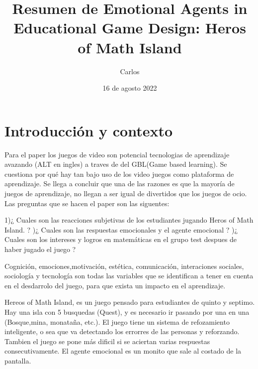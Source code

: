 \documentclass{book}
\begin{document}
\author{Carlos}
\title{Resumen de Emotional Agents in Educational Game Design: Heros of Math Island} 
\date{16 de agosto 2022}
\maketitle

\section{Introducción y contexto}
    Para el paper los juegos de video son potencial tecnologias de aprendizaje avazando (ALT en ingles) a traves de del GBL(Game based learning). Se cuestiona por qué hay tan bajo uso de los video juegos como plataforma de aprendizaje. Se llega a concluir que una de las razones es que la mayoría de juegos de aprendizaje, no llegan a ser igual de divertidos que los juegos de ocio. Las preguntas que se hacen el paper son las siguentes:
\newline
\newline


1)¿ Cuales son las reacciones subjetivas de los estudiantes jugando Heros of Math Island. ?
\newline
{})¿ Cuales son las respuestas emocionales y el agente emocional ?
\newline
{})¿ Cuales son los intereses y logros en matemáticas en el grupo test despues de haber jugado el juego ?
\newline
\newline


    Cognición, emociones,motivación, estética, comunicación, interaciones sociales, sociología y tecnología son todas las variables que se identifican  a tener en cuenta en el desdarrolo del juego, para que exista un impacto en el aprendizaje.
\newline
\newline


    Hereos of Math Island, es un juego pensado para estudiantes de quinto y septimo. Hay una isla con 5 busquedas (Quest), y es necesario ir pasando por una en una (Bosque,mina, monataña, etc.). El juego tiene un sistema de refozamiento inteligente, o sea que va detectando los errorres de las personas y reforzando. Tambien el juego se pone más dificil si se aciertan varias respuestas consecutivamente. El agente emocional es un monito que sale al costado de la pantalla.
\newline
\newline
\end{document}
